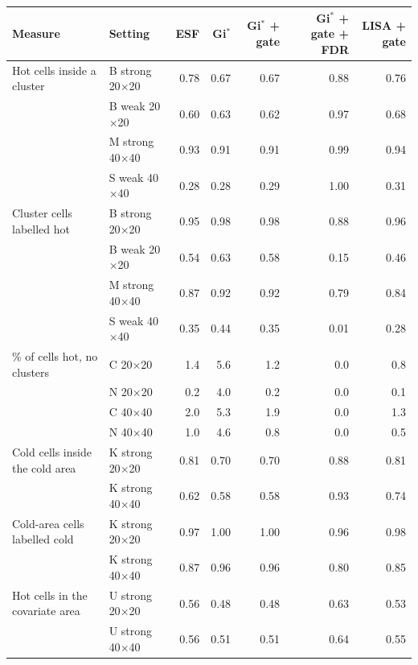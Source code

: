 \begin{tabular}{llrrrrr}
\toprule
Measure & Setting & ESF & Gi$^*$ & Gi$^*$ + gate & Gi$^*$ + gate + FDR & LISA + gate \\
\midrule
Hot cells inside a cluster & B strong 20$\times$20 & 0.78 & 0.67 & 0.67 & 0.88 & 0.76 \\
 & B weak 20$\times$20 & 0.60 & 0.63 & 0.62 & 0.97 & 0.68 \\
 & M strong 40$\times$40 & 0.93 & 0.91 & 0.91 & 0.99 & 0.94 \\
 & S weak 40$\times$40 & 0.28 & 0.28 & 0.29 & 1.00 & 0.31 \\
\addlinespace
Cluster cells labelled hot & B strong 20$\times$20 & 0.95 & 0.98 & 0.98 & 0.88 & 0.96 \\
 & B weak 20$\times$20 & 0.54 & 0.63 & 0.58 & 0.15 & 0.46 \\
 & M strong 40$\times$40 & 0.87 & 0.92 & 0.92 & 0.79 & 0.84 \\
 & S weak 40$\times$40 & 0.35 & 0.44 & 0.35 & 0.01 & 0.28 \\
\addlinespace
\% of cells hot, no clusters & C 20$\times$20 & 1.4 & 5.6 & 1.2 & 0.0 & 0.8 \\
 & N 20$\times$20 & 0.2 & 4.0 & 0.2 & 0.0 & 0.1 \\
 & C 40$\times$40 & 2.0 & 5.3 & 1.9 & 0.0 & 1.3 \\
 & N 40$\times$40 & 1.0 & 4.6 & 0.8 & 0.0 & 0.5 \\
\addlinespace
Cold cells inside the cold area & K strong 20$\times$20 & 0.81 & 0.70 & 0.70 & 0.88 & 0.81 \\
 & K strong 40$\times$40 & 0.62 & 0.58 & 0.58 & 0.93 & 0.74 \\
\addlinespace
Cold-area cells labelled cold & K strong 20$\times$20 & 0.97 & 1.00 & 1.00 & 0.96 & 0.98 \\
 & K strong 40$\times$40 & 0.87 & 0.96 & 0.96 & 0.80 & 0.85 \\
\addlinespace
Hot cells in the covariate area & U strong 20$\times$20 & 0.56 & 0.48 & 0.48 & 0.63 & 0.53 \\
 & U strong 40$\times$40 & 0.56 & 0.51 & 0.51 & 0.64 & 0.55 \\
\bottomrule
\end{tabular}

